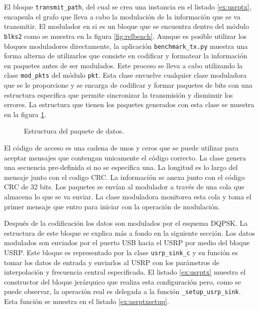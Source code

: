 El bloque \verb|transmit_path|, del cual se crea una instancia en el listado \ref{ex:usrptx},
encapsula el grafo que lleva a cabo la modulaci\'on de la informaci\'on que se va transmitir. El
modulador en si es un bloque que se encuentra dentro del m\'odulo \verb|blks2| como se muestra en la
figura \ref{fig:relbench}. Aunque es posible utilizar los bloques moduladores directamente, la
aplicaci\'on \verb|benchmark_tx.py| muestra una forma alterna de utilizarlos que consiste en
codificar y formatear la informaci\'on en paquetes antes de ser modulados. Este proceso se lleva a
cabo utilizando la clase \verb|mod_pkts| del m\'odulo \verb|pkt|. Esta clase envuelve cualquier
clase moduladora que se le proporcione y se encarga de codificar y formar paquetes de bits con una
estructura especifica que permite sincronizar la transmisi\'on y disminuir los errores. La
estructura que tienen los paquetes generados con esta clase se muestra en la figura \ref{fig:packet}.

\begin{figure}[tp]
  \centering
	\vspace{0.3in}
	\caption{Estructura del paquete de datos.}
	\label{fig:packet}
\end{figure}

El c\'odigo de acceso es una cadena de unos y ceros que se puede utilizar para aceptar mensajes que
contengan unicamente el c\'odigo correcto. La clase genera una secuencia pre-definida si no se
especifica una. La longitud es lo largo del mensaje junto con el codigo CRC. La informaci\'on se
anexa junto con el c\'odigo CRC de 32 bits. Los paquetes se env\'ian al modulador a trav\'es de una
cola que almacena lo que se va enviar. La clase moduladora monitorea esta cola y toma el primer
mensaje que entro para iniciar con la operaci\'on de modulaci\'on.

Despu\'es de la codificaci\'on los datos son modulados por el esquema DQPSK. La estructura de este
bloque se explica m\'as a fondo en la siguiente secci\'on. Los datos modulados son enviados por el
puerto USB hacia el USRP por medio del bloque USRP. Este bloque es representado por la clase
\verb|usrp_sink_c| y su funci\'on es tomar los datos de entrada y enviarlos al USRP con los
par\'ametros de interpolaci\'on y frecuencia central especificada. El listado \ref{ex:usrptx}
muestra el constructor del bloque jer\'arquico que realiza esta configuraci\'on pero, como se puede
observar, la operaci\'on real es delegada a la funci\'on \verb|_setup_usrp_sink|. Esta funci\'on se
muestra en el listado \ref{ex:usrptxsetup}.

